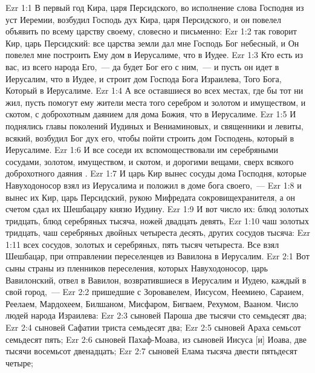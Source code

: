 \vs Ezr 1:1 В первый год Кира, царя Персидского, во исполнение слова Господня из уст Иеремии, возбудил Господь дух Кира, царя Персидского, и он повелел объявить по всему царству своему, словесно и письменно:
\vs Ezr 1:2 так говорит Кир, царь Персидский: все царства земли дал мне Господь Бог небесный, и Он повелел мне построить Ему дом в Иерусалиме, что в Иудее.
\vs Ezr 1:3 Кто есть из вас, из всего народа Его,~--- да будет Бог его с ним,~--- и пусть он идет в Иерусалим, что в Иудее, и строит дом Господа Бога Израилева, Того Бога, Который в Иерусалиме.
\vs Ezr 1:4 А все оставшиеся во всех местах, где бы тот ни жил, пусть помогут ему жители места того серебром и золотом и  имуществом, и скотом, с доброхотным даянием для дома Божия, что в Иерусалиме.
\rsbpar\vs Ezr 1:5 И поднялись главы поколений Иудиных и Вениаминовых, и священники и левиты, всякий,  возбудил Бог дух его, чтобы пойти строить дом Господень, который в Иерусалиме.
\vs Ezr 1:6 И все соседи их вспомоществовали им серебряными сосудами, золотом,  имуществом, и скотом, и дорогими вещами, сверх всякого доброхотного даяния .
\rsbpar\vs Ezr 1:7 И царь Кир вынес сосуды дома Господня, которые Навуходоносор взял из Иерусалима и положил в доме бога своего,~---
\vs Ezr 1:8 и вынес их Кир, царь Персидский, рукою Мифредата сокровищехранителя, а он счетом сдал их Шешбацару князю Иудину.
\vs Ezr 1:9 И вот число их: блюд золотых тридцать, блюд серебряных тысяча, ножей двадцать девять,
\vs Ezr 1:10 чаш золотых тридцать, чаш серебряных двойных четыреста десять, других сосудов тысяча:
\vs Ezr 1:11 всех сосудов, золотых и серебряных, пять тысяч четыреста. Все  взял  Шешбацар, при отправлении переселенцев из Вавилона в Иерусалим.
\vs Ezr 2:1 Вот сыны страны из пленников переселения, которых Навуходоносор, царь Вавилонский, отвел в Вавилон, возвратившиеся в Иерусалим и Иудею, каждый в свой город,~---
\vs Ezr 2:2 пришедшие с Зоровавелем, Иисусом, Неемиею, Сараием, Реелаем, Мардохеем, Билшаном, Мисфаром, Бигваем, Рехумом, Вааном. Число людей народа Израилева:
\vs Ezr 2:3 сыновей Пароша две тысячи сто семьдесят два;
\vs Ezr 2:4 сыновей Сафатии триста семьдесят два;
\vs Ezr 2:5 сыновей Араха семьсот семьдесят пять;
\vs Ezr 2:6 сыновей Пахаф-Моава, из сыновей Иисуса [и] Иоава, две тысячи восемьсот двенадцать;
\vs Ezr 2:7 сыновей Елама тысяча двести пятьдесят четыре;
